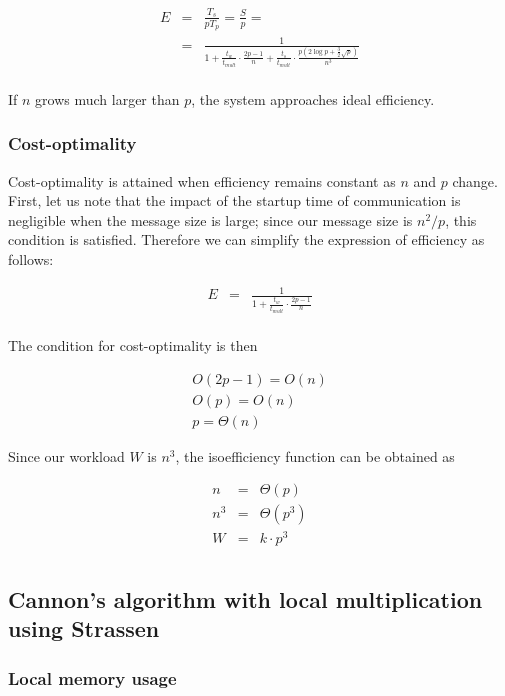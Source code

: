 \documentclass{article}
\begin{document}
\begin{eqnarray*}
E &=& \frac{T_s}{pT_p} = \frac{S}{ p} = \\
&=& \frac{ 1 }{ 1 + \frac{t_w}{t_{mult}} \cdot \frac{2p-1}{n} + \frac{t_s}{t_{mult}} \cdot \frac{p\left(2 \log{p} + \frac{3}{2} \sqrt{p}\right)}{n^3} } \\
\end{eqnarray*}

If $n$ grows much larger than $p$, the system approaches ideal efficiency.

\subsubsection{Cost-optimality}

Cost-optimality is attained when efficiency remains constant as $n$ and $p$ change.
First, let us note that the impact of the startup time of communication is negligible when the message size is large; since our message size is $n^2/p$, this condition is satisfied. Therefore we can simplify the expression of efficiency as follows:

\begin{eqnarray*}
E &=& \frac{ 1 }{ 1 + \frac{t_w}{t_{mult}} \cdot \frac{2p-1}{n} } \\
\end{eqnarray*}

The condition for cost-optimality is then

\begin{eqnarray*}
O(2p-1) = O(n) \\
O(p) = O(n) \\
p = \Theta(n)
\end{eqnarray*}

Since our workload $W$ is $n^3$, the isoefficiency function can be obtained as

\begin{eqnarray*}
n &=& \Theta (p) \\
n^3 &=& \Theta (p^3) \\
W &=& k \cdot p^3 \\
\end{eqnarray*}


\subsection{Cannon's algorithm with local multiplication using Strassen}

\subsubsection{Local memory usage}
\end{document}
